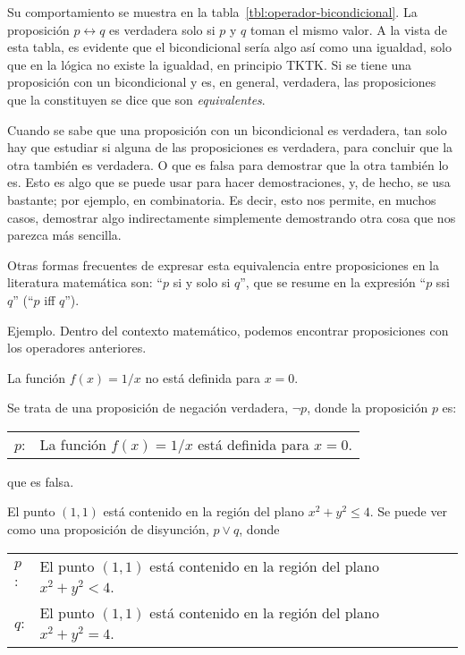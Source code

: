 Su comportamiento se muestra en la tabla~\ref{tbl:operador-bicondicional}.
La proposición $p \leftrightarrow q$ es verdadera solo si $p$ y $q$ toman el
mismo valor. A la vista de esta tabla, es evidente que el bicondicional
sería algo así como una igualdad, solo que en la lógica no existe la
igualdad, en principio TKTK. Si se tiene una proposición con un
bicondicional y es, en general, verdadera, las proposiciones que la
constituyen se dice que son \emph{equivalentes}.

Cuando se sabe que una proposición con un bicondicional es verdadera, tan
solo hay que estudiar si alguna de las proposiciones es verdadera, para
concluir que la otra también es verdadera. O que es falsa para demostrar que
la otra también lo es. Esto es algo que se puede usar para hacer
demostraciones, y, de hecho, se usa bastante; por ejemplo, en combinatoria.
Es decir, esto nos permite, en muchos casos, demostrar algo indirectamente
simplemente demostrando otra cosa que nos parezca más sencilla.

Otras formas frecuentes de expresar esta equivalencia entre proposiciones en
la literatura matemática son: ``$p$ si y solo si $q$'', que se resume en la
expresión ``$p$ ssi $q$'' (``$p$ iff $q$'').

Ejemplo. Dentro del contexto matemático, podemos encontrar proposiciones con
los operadores anteriores.

\begin{center}
  La función $f(x) = 1/x$ no está definida para $x = 0$.
\end{center}

Se trata de una proposición de negación verdadera, $\neg p$, donde la
proposición $p$ es:

\begin{center}
\begin{tabular}{ll}
  $p$: & La función $f(x) = 1/x$ está definida para $x = 0$.
\end{tabular}
\end{center}

\noindent que es falsa.

El punto $(1,1)$ está contenido en la región del plano $x^2 + y^2 \leq 4$.
Se puede ver como una proposición de disyunción, $p \lor q$, donde

\begin{center}
\begin{tabular}{ll}
  $p$: & El punto \((1,1)\) está contenido en la región del plano \(x^2 +
    y^2 < 4\). \\
  $q$: & El punto $(1,1)$ está contenido en la región del plano $x^2 + y^2 =
    4$. \\
\end{tabular}
\end{center}

